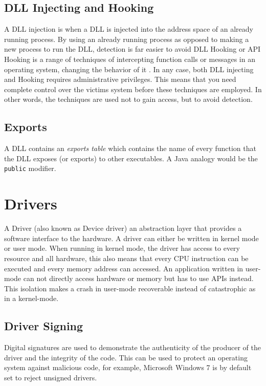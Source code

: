 \documentclass[11pt,english,a4paper]{report}
\begin{document}
\subsection{DLL Injecting and Hooking} \label{DLL_HOOKING}
A DLL injection is when a DLL is injected into the address space of an already running process. By using an already running process as opposed to making a new process to run the DLL, detection is far easier to avoid \cite{DEJAN_HOOK} DLL Hooking or API Hooking is a range of techniques of intercepting function calls or messages in an operating system, changing the behavior of it \cite{BREMER_HOOK}. In any case, both DLL injecting and Hooking requires administrative privileges. This means that you need complete control over the victims system before these techniques are employed. In other words, the techniques are used not to gain access, but to avoid detection. 

\subsection{Exports} \label{EXPORTS}
A DLL contains an \textit{exports table} which contains the name of every function that the DLL exposes (or exports) to other executables. A Java analogy would be the \texttt{public} modifier.

\section{Drivers}
A Driver (also known as Device driver) an abstraction layer that provides a software interface to the hardware. A driver can either be written in kernel mode or user mode. When running in kernel mode, the driver has access to every resource and all hardware, this also means that every CPU instruction can be executed and every memory address can accessed. An application written in user-mode can not directly access hardware or memory but has to use APIs instead. This isolation makes a crash in user-mode recoverable instead of catastrophic as in a kernel-mode.

\subsection{Driver Signing} \label{DRIVER_SIGN}
Digital signatures are used to demonstrate the authenticity of the producer of the driver and the integrity of the code. This can be used to protect an operating system against malicious code, for example, Microsoft Windows 7 is by default set to reject unsigned drivers.  
\end{document}
